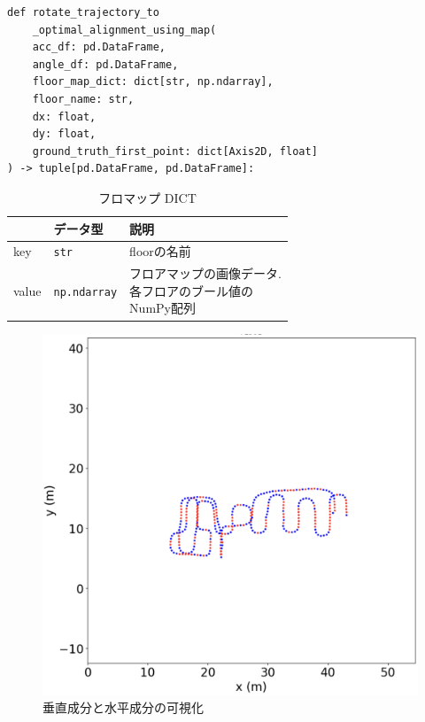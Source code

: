 \begin{lstlisting}[caption={フロアマップ情報を使用した  \\初期進行方向補正}, label=lst:pdr-rotate,float =h]
def rotate_trajectory_to
    _optimal_alignment_using_map(
    acc_df: pd.DataFrame,
    angle_df: pd.DataFrame,
    floor_map_dict: dict[str, np.ndarray],
    floor_name: str,
    dx: float,
    dy: float,
    ground_truth_first_point: dict[Axis2D, float]
) -> tuple[pd.DataFrame, pd.DataFrame]:

\end{lstlisting}

\begin{table}[ht]
	\caption{フロマップ DICT}
	\centering
	\begin{tabular}{lll}
		\hline
		      & \textbf{データ型}       & \textbf{説明}             \\ \hline
		key   & \texttt{str}        & floorの名前                \\ \hline
		value & \texttt{np.ndarray} & \makecell{フロアマップの画像データ. \\各フロアのブール値の\\NumPy配列} \\ \hline
	\end{tabular}
	\label{tab:map-dict}
\end{table}

\begin{figure}[ht]
	\centering
	\includegraphics[width=\linewidth]{image/rb.jpg}
	\caption{垂直成分と水平成分の可視化}    \label{fig:color}
\end{figure}

